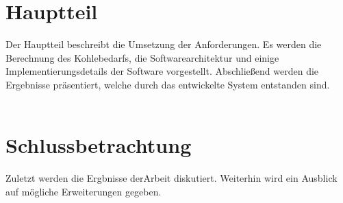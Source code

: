 \documentclass{scrbook} %
\begin{document}
	\chapter{Hauptteil}
	Der Hauptteil beschreibt die Umsetzung der Anforderungen. Es werden die Berechnung des Kohlebedarfs, die Softwarearchitektur und einige Implementierungsdetails der Software vorgestellt. Abschließend werden die Ergebnisse präsentiert, welche durch das entwickelte System entstanden sind.\\
	\\
	
	
	
	

	\chapter{Schlussbetrachtung}
	Zuletzt werden die Ergbnisse derArbeit diskutiert. Weiterhin wird ein Ausblick auf mögliche Erweiterungen gegeben.\\
	\\
	
	

	\ifisbook\cleardoubleemptypage\fi
	\printbibliography %

	\appendix %


	\ifisbook\pagestyle{plain}\cleardoubleemptypage\fi
\end{document}
